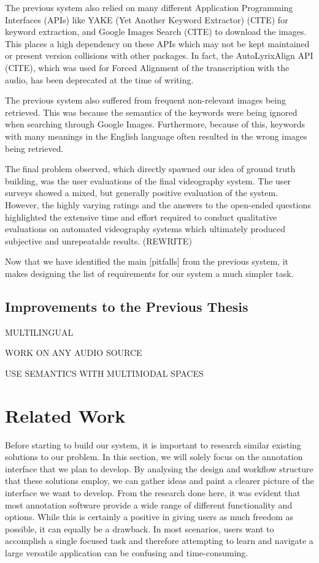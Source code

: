 \documentclass{l4proj}
\begin{document}
The previous system also relied on many different Application Programming Interfaces (APIs) like YAKE (Yet Another Keyword Extractor) \cite{yake}(CITE) for keyword extraction, and Google Images Search \cite{google_images}(CITE) to download the images. This places a high dependency on these APIs which may not be kept maintained or present version collisions with other packages. In fact, the AutoLyrixAlign API \cite{autolyrixalign}(CITE), which was used for Forced Alignment of the transcription with the audio, has been deprecated at the time of writing.

The previous system also suffered from frequent non-relevant images being retrieved. This was because the semantics of the keywords were being ignored when searching through Google Images. Furthermore, because of this, keywords with many meanings in the English language often resulted in the wrong images being retrieved. 

The final problem observed, which directly spawned our idea of ground truth building, was the user evaluations of the final videography system. The user surveys showed a mixed, but generally positive evaluation of the system. However, the highly varying ratings and the answers to the open-ended questions highlighted the extensive time and effort required to conduct qualitative evaluations on automated videography systems which ultimately produced subjective and unrepeatable results. (REWRITE)

Now that we have identified the main [pitfalls] from the previous system, it makes designing the list of requirements for our system a much simpler task.

\subsection{Improvements to the Previous Thesis}
MULTILINGUAL

WORK ON ANY AUDIO SOURCE

USE SEMANTICS WITH MULTIMODAL SPACES


\section{Related Work}
Before starting to build our system, it is important to research similar existing solutions to our problem. In this section, we will solely focus on the annotation interface that we plan to develop. By analysing the design and workflow structure that these solutions employ, we can gather ideas and paint a clearer picture of the interface we want to develop. From the research done here, it was evident that most annotation software provide a wide range of different functionality and options. While this is certainly a positive in giving users as much freedom as possible, it can equally be a drawback. In most scenarios, users want to accomplish a single focused task and therefore attempting to learn and navigate a large versatile application can be confusing and time-consuming.
\end{document}
